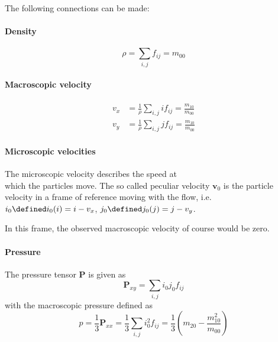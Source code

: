 
The following connections can be made:
\paragraph{Density}
\label{par:Density}
\begin{equation}
  \rho = \sum_{i,j} f_{ij} = m_{00}
\end{equation}

\paragraph{Macroscopic velocity}
\label{par:Macroscopic velocity}
\begin{equation}
  \begin{aligned}
    v_x & = \frac{1}{\rho}\sum_{i,j} i f_{ij} = \frac{ m_{10} }{ m_{00} }\\
    v_y & = \frac{1}{\rho}\sum_{i,j} j f_{ij} = \frac{ m_{10} }{ m_{00} }
  \end{aligned}
\end{equation}

\paragraph{Microscopic velocities}
\label{par:Microscopic velocities}

The microscopic velocity describes the speed at \\which the particles move. The so called  peculiar velocity $\mathbf{v}_0$ is the particle velocity in a frame of reference moving with the flow, i.e. $i_0 \defined i_0(i) = i-v_x$, $j_0 \defined j_0(j) = j-v_y$.

In this frame, the observed macroscopic velocity of course would be zero.

\paragraph{Pressure}
\label{par:Pressure}
The pressure tensor $\mathbf{P}$ is given as
\begin{equation}
  \mathbf{P}_{xy} = \sum_{i,j} i_0 j_0 f_{ij}
\end{equation}
with the macroscopic pressure defined as
\begin{equation}
  \label{eq:pressure}
  p = \frac{1}{3}\mathbf{P}_{xx} = \frac{1}{3}\sum_{i,j} i_0^2 f_{ij} = \frac{1}{3} \left(m_{20} - \frac{ m_{10}^2 }{ m_{00} } \right)
\end{equation}
